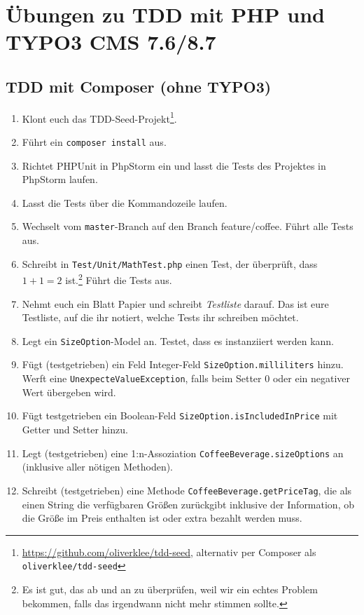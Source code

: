\documentclass[a4paper,12pt]{scrartcl}
\begin{document}
\raggedbottom

\section{Übungen zu TDD mit PHP und TYPO3 CMS 7.6/8.7}

\subsection{TDD mit Composer (ohne TYPO3)}
\begin{enumerate}
  \item Klont euch das TDD-Seed-Projekt\footnote{\url{https://github.com/oliverklee/tdd-seed}, alternativ per Composer als \texttt{oliverklee/tdd-seed}}.
  \item Führt ein \texttt{composer install} aus.
  \item Richtet PHPUnit in PhpStorm ein und lasst die Tests des Projektes in PhpStorm laufen.
  \item Lasst die Tests über die Kommandozeile laufen.
  \item Wechselt vom \texttt{master}-Branch auf den Branch {feature/coffee}. Führt alle Tests aus.
  \item Schreibt in \texttt{Test/Unit/MathTest.php} einen Test, der überprüft, dass $1 + 1 = 2$ ist.\footnote{Es ist gut, das ab und an zu überprüfen, weil wir ein echtes Problem bekommen, falls das irgendwann nicht mehr stimmen sollte.} Führt die Tests aus.
  \item Nehmt euch ein Blatt Papier und schreibt \emph{Testliste} darauf. Das ist eure Testliste, auf die ihr notiert, welche Tests ihr schreiben möchtet.
  \item Legt ein \texttt{SizeOption}-Model an. Testet, dass es instanziiert werden kann.
  \item Fügt (testgetrieben) ein Feld Integer-Feld \texttt{SizeOption.milliliters}  hinzu. Werft eine \texttt{UnexpecteValueException}, falls beim Setter 0 oder ein negativer Wert übergeben wird.
  \item Fügt testgetrieben ein Boolean-Feld \texttt{SizeOption.isIncludedInPrice} mit Getter und Setter hinzu.
  \item Legt (testgetrieben) eine 1:n-Assoziation \texttt{CoffeeBeverage.sizeOptions} an (inklusive aller nötigen Methoden).
  \item Schreibt (testgetrieben) eine Methode \texttt{CoffeeBeverage.getPriceTag}, die als einen String die verfügbaren Größen zurückgibt inklusive der Information, ob die Größe im Preis enthalten ist oder extra bezahlt werden muss.
\end{enumerate}
\pagebreak
\end{document}
